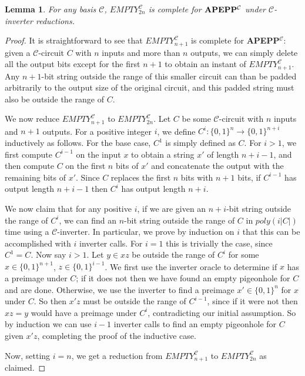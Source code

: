 \documentclass[11pt]{article}
\newtheorem{lemma}{Lemma}
\def\cl{\bf}
\begin{document}
\begin{lemma}\label{lem:swapping-sizes}
For any basis $\mathcal{C}$, {\sc $EMPTY_{2n}^{\mathcal{C}}$} is complete for ${\cl APEPP^{\mathcal{C}}}$ under $\mathcal{C}$-inverter reductions.
\end{lemma}
\begin{proof}
It is straightforward to see that {\sc $EMPTY_{n+1}^{\mathcal{C}}$} is complete for {\cl APEPP}$^{\mathcal{C}}$: given a $\mathcal{C}$-circuit $C$ with $n$ inputs and more than $n$ outputs, we can simply delete all the output bits except for the first $n+1$ to obtain an instant of {\sc $EMPTY_{n+1}^{\mathcal{C}}$}. Any $n+1$-bit string outside the range of this smaller circuit can than be padded arbitrarily to the output size of the original circuit, and this padded string must also be outside the range of $C$.

We now reduce {\sc $EMPTY_{n+1}^{\mathcal{C}}$} to {\sc $EMPTY_{2n}^{\mathcal{C}}$}. Let $C$ be some $\mathcal{C}$-circuit with $n$ inputs and $n+1$ outputs. For a positive integer $i$, we define $C^i: \{0,1\}^n \rightarrow \{0,1\}^{n + i}$ inductively as follows. For the base case, $C^1$ is simply defined as $C$. For $i > 1$, we first compute $C^{i-1}$ on the input $x$ to obtain a string $x'$ of length $n + i - 1$, and then compute $C$ on the first $n$ bits of $x'$ and concatenate the output with the remaining bits of $x'$. Since $C$ replaces the first $n$ bits with $n+1$ bits, if $C^{i-1}$ has output length $n + i-1$ then $C^i$ has output length $n + i$.

We now claim that for any positive $i$, if we are given an $n+i$-bit string outside the range of $C^i$, we can find an $n$-bit string outside the range of $C$ in $poly(i|C|)$ time using a $\mathcal{C}$-inverter. In particular, we prove by induction on $i$ that this can be accomplished with $i$ inverter calls. For $i=1$ this is trivially the case, since $C^1=C$. Now say $i > 1$. Let $y \in xz$ be outside the range of $C^i$ for some $x \in \{0,1\}^{n+1}$, $z \in \{0,1\}^{i-1}$. We first use the inverter oracle to determine if $x$ has a preimage under $C$; if it does not then we have found an empty pigeonhole for $C$ and are done. Otherwise, we use the inverter to find a preimage $x' \in \{0,1\}^n$ for $x$ under $C$. So then $x'z$ must be outside the range of $C^{i-1}$, since if it were not then $xz=y$ would have a preimage under $C^i$, contradicting our initial assumption. So by induction we can use $i-1$ inverter calls to find an empty pigeonhole for $C$ given $x'z$, completing the proof of the inductive case.

Now, setting $i = n$, we get a reduction from {\sc $EMPTY_{n+1}^{\mathcal{C}}$} to {\sc $EMPTY_{2n}^{\mathcal{C}}$} as claimed.

\end{proof}
\end{document}
